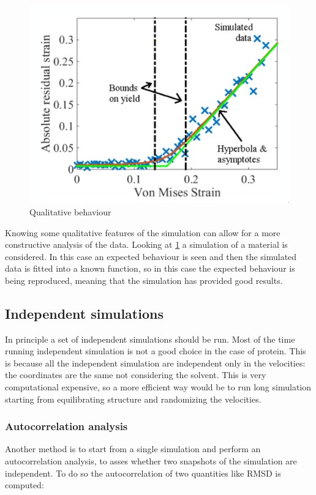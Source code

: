 	\begin{figure}[H]
		\centering
		\includegraphics[scale=0.5]{qualitative-behaviour}
		\caption{Qualitative behaviour}
		\label{fig:qualitative-behaviour}
	\end{figure}

	Knowing some qualitative features of the simulation can allow for a more constructive analysis of the data.
	Looking at \ref{fig:qualitative-behaviour} a simulation of a material is considered.
	In this case an expected behaviour is seen and then the simulated data is fitted into a known function, so in this case the expected behaviour is being reproduced, meaning that the simulation has provided good results.

	\subsection{Independent simulations}
	In principle a set of independent simulations should be run.
	Most of the time running independent simulation is not a good choice in the case of protein.
	This is because all the independent simulation are independent only in the velocities: the coordinates are the same not considering the solvent.
	This is very computational expensive, so a more efficient way would be to run long simulation starting from equilibrating structure and randomizing the velocities.

		\subsubsection{Autocorrelation analysis}
		Another method is to start from a single simulation and perform an autocorrelation analysis, to asses whether two snapshots of the simulation are independent.
		To do so the autocorrelation of two quantities like RMSD is computed:

